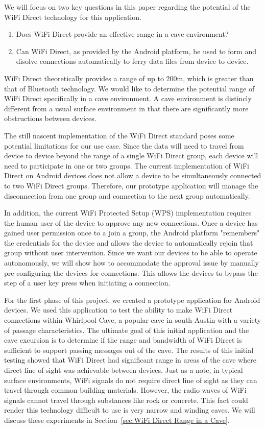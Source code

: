 \documentclass[10pt,twocolumn]{article}
\begin{document}
We will focus on two key questions in this paper regarding the potential of the WiFi Direct technology for this application.
\begin{enumerate}
\item Does WiFi Direct provide an effective range in a cave environment?
\item Can WiFi Direct, as provided by the Android platform, be used to form and disolve connections automatically to ferry data files from device to device.
\end{enumerate} 
WiFi Direct theoretically provides a range of up to 200m, which is greater than that of Bluetooth technology. 
We would like to determine the potential range of WiFi Direct specifically in a cave environment.
A cave environment is distincly different from a usual surface environment in that there are significantly more obstructions between devices. 

The still nascent implementation of the WiFi Direct standard poses some potential limitations for our use case.
Since the data will need to travel from device to device beyond the range of a single WiFi Direct group, 
each device will need to participate in one or two groups. 
The current implementation of WiFi Direct on Android devices does not allow a device to be simultaneously connected to two WiFi Direct groups.
Therefore, our prototype application will manage the disconnection from one group and connection to the next group automatically.

In addition, the current WiFi Protected Setup (WPS) implementation requires the human user of the device to approve any new connections.
Once a device has gained user permission once to a join a group, the Android platform "remembers" the credentials for the device and allows the device to automatically rejoin that group without user intervention.
Since we want our devices to be able to operate autonomously, we will show how to accommodate the approval issue by manually pre-configuring the devices for connections.
This allows the devices to bypass the step of a user key press when initiating a connection.
 
For the first phase of this project, we created a prototype application for Android devices. 
We used this application to test the ability to make WiFi Direct connections within Whirlpool Cave, a popular cave in south Austin with a variety of passage characteristics. 
The ultimate goal of this initial application and the cave excursion is to determine if the range and bandwidth of WiFi Direct is sufficient to support passing messages out of the cave.
The results of this initial testing showed that WiFi Direct had significant range in areas of the cave where direct line of sight was achievable between devices.
Just as a note, in typical surface environments, WiFi signals do not require direct line of sight as they can travel through common building materials.
However, the radio waves of WiFi signals cannot travel through substances like rock or concrete.
This fact could render this technology difficult to use is very narrow and winding caves.
We will discuss these experiments in Section~\ref{sec:WiFi Direct Range in a Cave}.
\end{document}
